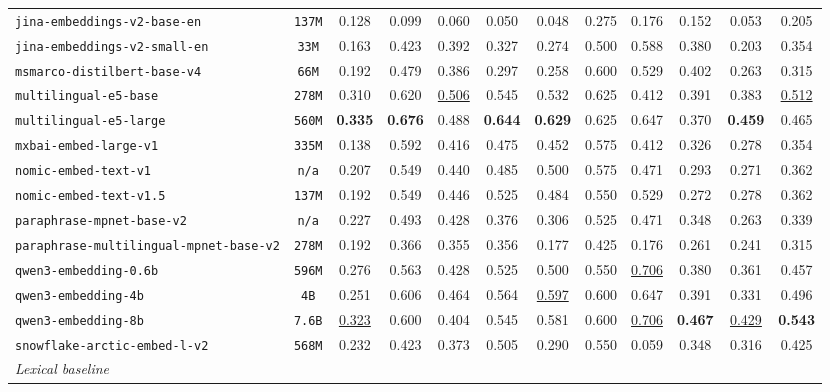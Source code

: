 \documentclass[11pt]{article}
\begin{document}
\begin{table}[htbp]
{\begin{tabular}{lccccccccccc}
\texttt{jina-embeddings-v2-base-en} & \texttt{137M} & 0.128 & 0.099 & 0.060 & 0.050 & 0.048 & 0.275 & 0.176 & 0.152 & 0.053 & 0.205 \\
\texttt{jina-embeddings-v2-small-en} & \texttt{33M} & 0.163 & 0.423 & 0.392 & 0.327 & 0.274 & 0.500 & 0.588 & 0.380 & 0.203 & 0.354 \\
\texttt{msmarco-distilbert-base-v4} & \texttt{66M} & 0.192 & 0.479 & 0.386 & 0.297 & 0.258 & 0.600 & 0.529 & 0.402 & 0.263 & 0.315 \\
\texttt{multilingual-e5-base} & \texttt{278M} & 0.310 & 0.620 & \underline{0.506} & 0.545 & 0.532 & 0.625 & 0.412 & 0.391 & 0.383 & \underline{0.512} \\
\texttt{multilingual-e5-large} & \texttt{560M} & \textbf{0.335} & \textbf{0.676} & 0.488 & \textbf{0.644} & \textbf{0.629} & 0.625 & 0.647 & 0.370 & \textbf{0.459} & 0.465 \\
\texttt{mxbai-embed-large-v1} & \texttt{335M} & 0.138 & 0.592 & 0.416 & 0.475 & 0.452 & 0.575 & 0.412 & 0.326 & 0.278 & 0.354 \\
\texttt{nomic-embed-text-v1} & \texttt{n/a} & 0.207 & 0.549 & 0.440 & 0.485 & 0.500 & 0.575 & 0.471 & 0.293 & 0.271 & 0.362 \\
\texttt{nomic-embed-text-v1.5} & \texttt{137M} & 0.192 & 0.549 & 0.446 & 0.525 & 0.484 & 0.550 & 0.529 & 0.272 & 0.278 & 0.362 \\
\texttt{paraphrase-mpnet-base-v2} & \texttt{n/a} & 0.227 & 0.493 & 0.428 & 0.376 & 0.306 & 0.525 & 0.471 & 0.348 & 0.263 & 0.339 \\
\texttt{paraphrase-multilingual-mpnet-base-v2} & \texttt{278M} & 0.192 & 0.366 & 0.355 & 0.356 & 0.177 & 0.425 & 0.176 & 0.261 & 0.241 & 0.315 \\
\texttt{qwen3-embedding-0.6b} & \texttt{596M} & 0.276 & 0.563 & 0.428 & 0.525 & 0.500 & 0.550 & \underline{0.706} & 0.380 & 0.361 & 0.457 \\
\texttt{qwen3-embedding-4b} & \texttt{4B} & 0.251 & 0.606 & 0.464 & 0.564 & \underline{0.597} & 0.600 & 0.647 & 0.391 & 0.331 & 0.496 \\
\texttt{qwen3-embedding-8b} & \texttt{7.6B} & \underline{0.323} & 0.600 & 0.404 & 0.545 & 0.581 & 0.600 & \underline{0.706} & \textbf{0.467} & \underline{0.429} & \textbf{0.543} \\
\texttt{snowflake-arctic-embed-l-v2} & \texttt{568M} & 0.232 & 0.423 & 0.373 & 0.505 & 0.290 & 0.550 & 0.059 & 0.348 & 0.316 & 0.425 \\
\midrule
\multicolumn{12}{l}{\textit{Lexical baseline}} \\

\end{tabular}}
\end{table}
\end{document}

